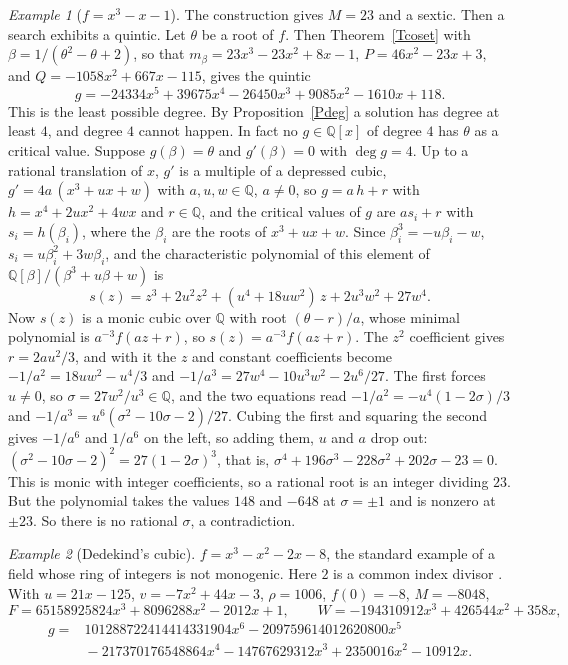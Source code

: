 \documentclass[10pt]{article}
\newcommand\Q{\mathbb{Q}}
\theoremstyle{plain}
\theoremstyle{remark}
\newtheorem{example}{Example}
\theoremstyle{plain}
\begin{document}
\begin{example}[$f = x^{3}-x-1$]
  The construction gives $M = 23$ and a sextic. Then a search exhibits a
  quintic. Let $\theta$ be a root of $f$. Then Theorem~\ref{Tcoset}
  with $\beta = 1/(\theta^{2} - \theta + 2)$, so that
  $m_{\beta} = 23x^{3} - 23x^{2} + 8x - 1$, $P = 46x^{2} - 23x + 3$, and
  $Q = -1058x^{2} + 667x - 115$, gives the quintic
  \[
    g = -24334x^{5} + 39675x^{4} - 26450x^{3} + 9085x^{2} - 1610x + 118 .
  \]
  This is the least possible degree. By Proposition~\ref{Pdeg} a solution
  has degree at least $4$, and degree $4$ cannot happen. In fact no
  $g \in \Q[x]$ of degree $4$ has $\theta$ as a critical value. Suppose
  $g(\beta) = \theta$ and $g'(\beta) = 0$ with $\deg g = 4$. Up to a rational
  translation of $x$, $g'$ is a multiple of a depressed cubic,
  $g' = 4a\,(x^{3} + ux + w)$ with $a, u, w \in \Q$, $a \neq 0$, so
  $g = a\,h + r$ with $h = x^{4} + 2ux^{2} + 4wx$ and $r \in \Q$, and the
  critical values of $g$ are $a s_{i} + r$ with $s_{i} = h(\beta_{i})$, where
  the $\beta_{i}$ are the roots of $x^{3} + ux + w$. Since
  $\beta_{i}^{3} = -u\beta_{i} - w$, $s_{i} = u\beta_{i}^{2} + 3w\beta_{i}$,
  and the characteristic polynomial of this element of
  $\Q[\beta]/(\beta^{3} + u\beta + w)$ is
  \[
    s(z) = z^{3} + 2u^{2}z^{2} + (u^{4} + 18uw^{2})\,z + 2u^{3}w^{2} + 27w^{4} .
  \]
  Now $s(z)$ is a monic cubic over $\Q$ with root $(\theta - r)/a$, whose
  minimal polynomial is $a^{-3}f(az + r)$, so $s(z) = a^{-3}f(az + r)$. The
  $z^{2}$ coefficient gives $r = 2au^{2}/3$, and with it the $z$ and constant
  coefficients become $-1/a^{2} = 18uw^{2} - u^{4}/3$ and
  $-1/a^{3} = 27w^{4} - 10u^{3}w^{2} - 2u^{6}/27$. The first forces
  $u \neq 0$, so $\sigma = 27w^{2}/u^{3} \in \Q$, and the two equations read
  $-1/a^{2} = -u^{4}(1 - 2\sigma)/3$ and
  $-1/a^{3} = u^{6}(\sigma^{2} - 10\sigma - 2)/27$. Cubing the first and
  squaring the second gives $-1/a^{6}$ and $1/a^{6}$ on the left, so adding
  them, $u$ and $a$ drop out:
  $(\sigma^{2} - 10\sigma - 2)^{2} = 27(1 - 2\sigma)^{3}$, that is,
  $\sigma^{4} + 196\sigma^{3} - 228\sigma^{2} + 202\sigma - 23 = 0$. This is
  monic with integer coefficients, so a rational root is an integer dividing
  $23$. But the polynomial takes the values $148$ and $-648$ at
  $\sigma = \pm 1$ and is nonzero at $\pm 23$. So there is no rational
  $\sigma$, a contradiction.
\end{example}

\begin{example}[Dedekind's cubic]\label{Ex85}
  $f = x^{3} - x^{2} - 2x - 8$, the standard example of a field whose ring of
  integers is not monogenic. Here $2$ is a common index divisor
  \cite{dedekind1878}. With $u = 21x - 125$, $v = -7x^{2} + 44x - 3$,
  $\rho = 1006$, $f(0) = -8$, $M = -8048$,
  \[
    F = 65158925824x^{3} + 8096288x^{2} - 2012x + 1, \qquad
    W = -194310912x^{3} + 426544x^{2} + 358x,
  \]
  \[
    \begin{aligned}
      g = {}& 101288722414414331904x^{6} - 209759614012620800x^{5} \\
            & {} - 217370176548864x^{4} - 14767629312x^{3}
                 + 2350016x^{2} - 10912x .
    \end{aligned}
  \]
\end{example}
\end{document}
